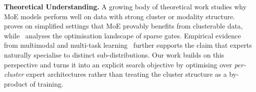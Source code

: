 \vspace{2mm}

\textbf{Theoretical Understanding.}
A growing body of theoretical work studies why MoE models perform
well on data with strong cluster or modality structure.
\cite{chen2022towards} proves on simplified settings that MoE
provably benefits from clusterable data, while~\cite{li2024theory}
analyses the optimisation landscape of sparse gates. Empirical
evidence from multimodal and multi-task
learning~\cite{chai2022mixture,guo2018multi,hu2025multi,zhou2022mixture}
further supports the claim that experts naturally specialise to
distinct sub-distributions. Our work builds on this perspective and
turns it into an explicit search objective by optimising over
\emph{per-cluster} expert architectures rather than treating the
cluster structure as a by-product of training.

\vspace{2mm}

